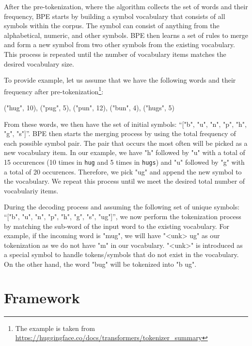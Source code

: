 After the pre-tokenization, where the algorithm collects the set of words and their frequency, BPE starts by building a symbol vocabulary that consists of all symbols within the corpus. The symbol can consist of anything from the alphabetical, numeric, and other symbols. BPE then learns a set of rules to merge and form a new symbol from two other symbols from the existing vocabulary. This process is repeated until the number of vocabulary items matches the desired vocabulary size.

To provide example, let us assume that we have the following words and their frequency after pre-tokenization\footnote{The example is taken from \url{https://huggingface.co/docs/transformers/tokenizer_summary}}:

\bigskip
("hug", 10), ("pug", 5), ("pun", 12), ("bun", 4), ("hugs", 5)
\bigskip

From these words, we then have the set of initial symbols: ``["b", "u", "n", "p", "h", "g", "s"]''. BPE then starts the merging process by using the total frequency of each possible symbol pair. The pair that occurs the most often will be picked as a new vocabulary item. In our example, we have "h" followed by "u" with a total of 15 occurences (10 times in \texttt{hug} and 5 times in \texttt{hugs}) and "u" followed by "g" with a total of 20 occurences. Therefore, we pick "ug" and append the new symbol to the vocabulary. We repeat this process until we meet the desired total number of vocabulariy items.

During the decoding process and assuming the following set of unique symbols: ``["b", "u", "n", "p", "h", "g", "s", "ug"]'', we now perform the tokenization process by matching the sub-word of the input word to the existing vocabulary. For example, if the incoming word is "mug", we will have "<unk> ug" as our tokenization as we do not have "m" in our vocabulary. "<unk>" is introduced as a special symbol to handle tokens/symbols that do not exist in the vocabulary. On the other hand, the word "bug" will be tokenized into "b ug".

\section{Framework}
\label{sec:framework}
